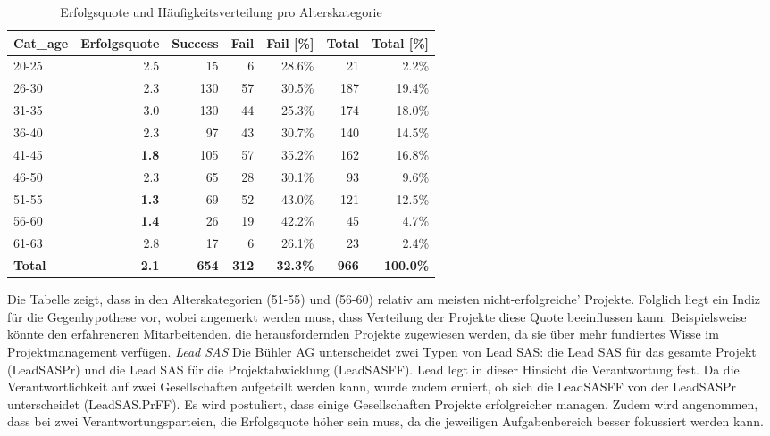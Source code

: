 \begin{table}[htbp]
	\centering
	\caption{Erfolgsquote und Häufigkeitsverteilung pro Alterskategorie}
	\begin{tabular}{lrrrrrr}
		\textbf{Cat\_age} & \multicolumn{1}{l}{\textbf{Erfolgsquote}} & \multicolumn{1}{l}{\textbf{Success}} & \multicolumn{1}{l}{\textbf{Fail}} & \multicolumn{1}{l}{\textbf{Fail [\%]}} & \multicolumn{1}{l}{\textbf{Total}} & \multicolumn{1}{l}{\textbf{Total [\%]}} \\\hline
		20-25 & 2.5   & 15    & 6     & 28.6\% & 21    & 2.2\% \\
		26-30 & 2.3   & 130   & 57    & 30.5\% & 187   & 19.4\% \\
		31-35 & 3.0   & 130   & 44    & 25.3\% & 174   & 18.0\% \\
		36-40 & 2.3   & 97    & 43    & 30.7\% & 140   & 14.5\% \\
		41-45 & \textbf{1.8} & 105   & 57    & 35.2\% & 162   & 16.8\% \\
		46-50 & 2.3   & 65    & 28    & 30.1\% & 93    & 9.6\% \\
		51-55 & \textbf{1.3} & 69    & 52    & 43.0\% & 121   & 12.5\% \\
		56-60 & \textbf{1.4} & 26    & 19    & 42.2\% & 45    & 4.7\% \\
		61-63 & 2.8   & 17    & 6     & 26.1\% & 23    & 2.4\% \\\hline
		\textbf{Total} & \textbf{2.1} & \textbf{654} & \textbf{312} & \textbf{32.3\%} & \textbf{966} & \textbf{100.0\%} \\
	\end{tabular}%
	\label{fagecat}%
\end{table}%
Die Tabelle zeigt, dass in den Alterskategorien (51-55) und (56-60) relativ am meisten nicht-erfolgreiche' Projekte. Folglich liegt ein Indiz für die Gegenhypothese vor, wobei angemerkt werden muss, dass Verteilung der Projekte diese Quote beeinflussen kann. Beispielsweise könnte den erfahreneren Mitarbeitenden, die herausfordernden Projekte zugewiesen werden, da sie über mehr fundiertes Wisse im Projektmanagement verfügen.
%
%
\newline\newline\textit{Lead SAS}
Die Bühler AG unterscheidet zwei Typen von Lead SAS: die Lead SAS für das gesamte Projekt (LeadSASPr) und die Lead SAS für die Projektabwicklung (LeadSASFF). Lead legt in dieser Hinsicht die Verantwortung fest. Da die Verantwortlichkeit auf zwei Gesellschaften aufgeteilt werden kann, wurde zudem eruiert, ob sich die LeadSASFF von der LeadSASPr unterscheidet (LeadSAS.PrFF). Es wird postuliert, dass einige Gesellschaften Projekte erfolgreicher managen. Zudem wird angenommen, dass bei zwei Verantwortungsparteien, die Erfolgsquote höher sein muss, da die jeweiligen Aufgabenbereich besser fokussiert werden kann.
